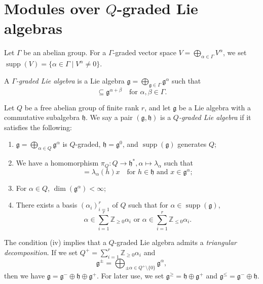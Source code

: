 \documentclass[a4paper, 12pt, reqno]{amsart}
\DeclareMathOperator{\supp}{supp}
\begin{document}
\section{Modules over $Q$-graded Lie algebras}
\label{sec:modules-over-q}

Let $\Gamma$ be an abelian group.
For a $\Gamma$-graded vector space $V = \bigoplus_{\alpha \in \Gamma}V^{\alpha}$, we set $\supp(V) = \{\alpha \in \Gamma \mid V^{\alpha} \neq 0\}$.

A \emph{$\Gamma$-graded Lie algebra} is a Lie algebra $\mathfrak{g} = \bigoplus_{\mathfrak{g} \in \Gamma}\mathfrak{g}^{\alpha}$ such that
\begin{equation*}
  [\mathfrak{g}^{\alpha}, \mathfrak{g}^{\beta}] \subseteq \mathfrak{g}^{\alpha + \beta} \quad \text{for $\alpha, \beta \in \Gamma$}.
\end{equation*}

Let $Q$ be a free abelian group of finite rank $r$, and let $\mathfrak{g}$ be a Lie algebra with a commutative subalgebra $\mathfrak{h}$.
We say a pair $(\mathfrak{g}, \mathfrak{h})$ is a \emph{$Q$-graded Lie algebra} if it satisfies the following:
\begin{enumerate}
\item $\mathfrak{g} = \bigoplus_{\alpha \in Q}\mathfrak{g}^{\alpha}$ is $Q$-graded, $\mathfrak{h} = \mathfrak{g}^0$, and $\supp(\mathfrak{g})$ generates $Q$;
\item We have a homomorphism $\pi_Q: Q \to \mathfrak{h}^*, \alpha \mapsto \lambda_{\alpha}$ such  that
  \begin{equation*}
    [h, x] = \lambda_{\alpha}(h)x \quad \text{for $h \in \mathfrak{h}$ and $x \in \mathfrak{g}^{\alpha}$};
  \end{equation*}
\item For $\alpha \in Q$, $\dim(\mathfrak{g}^{\alpha}) < \infty$;
\item There exists a basis $(\alpha_i)_{i = 1}^r$ of $Q$ such that for $\alpha \in \supp(\mathfrak{g})$,
  \begin{equation*}
    \text{$\alpha \in \sum_{i = 1}^r\mathbb{Z}_{\ge 0}\alpha_i$ or $\alpha \in \sum_{i = 1}^r\mathbb{Z}_{\le 0}\alpha_i$}.
  \end{equation*}
\end{enumerate}

The condition (iv) implies that a $Q$-graded Lie algebra admits a \emph{triangular decomposition}.
If we set $Q^+ = \sum_{i = 1}^r\mathbb{Z}_{\ge 0}\alpha_i$ and
\begin{equation*}
  \mathfrak{g}^{\pm} = \bigoplus_{\pm \alpha \in Q^+ \setminus \{0\}}\mathfrak{g}^{\alpha},
\end{equation*}
then we have $\mathfrak{g} = \mathfrak{g}^- \oplus \mathfrak{h} \oplus \mathfrak{g}^+$.
For later use, we set $\mathfrak{g}^{\ge} = \mathfrak{h} \oplus \mathfrak{g}^+$ and $\mathfrak{g}^{\le} = \mathfrak{g}^- \oplus \mathfrak{h}$.
\end{document}
